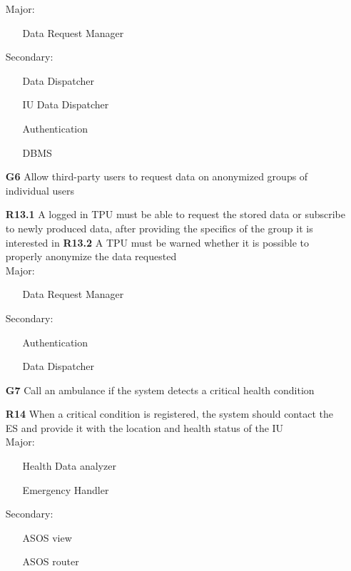 \begin{itemize}
Major:
\begin{itemize}
\item[\textbullet]Data Request Manager 
\end{itemize}
Secondary:
\begin{itemize}
\item[\textbullet]Data Dispatcher
\item[\textbullet]IU Data Dispatcher
\item[\textbullet]Authentication
\item[\textbullet]DBMS
\end{itemize}

\item [\textbf{G6}] Allow third-party users to request data on anonymized groups of individual users

\subitem \textbf{R13.1} A logged in TPU must be able to request the stored data or subscribe to newly produced data, after providing the specifics of the group it is interested in
\subitem \textbf{R13.2} A TPU must be warned whether it is possible to properly anonymize the data requested\\

Major:
\begin{itemize}
\item[\textbullet]Data Request Manager 
\end{itemize}
Secondary:
\begin{itemize}
\item[\textbullet]Authentication
\item[\textbullet]Data Dispatcher
\end{itemize}

\item [\textbf{G7}] Call an ambulance if the system detects a critical health condition

\subitem \textbf{R14} When a critical condition is registered, the system should contact the ES and provide it with the location and health status of the IU\\

Major:
\begin{itemize}
\item[\textbullet] Health Data analyzer
\item[\textbullet] Emergency Handler
\end{itemize}
Secondary:
\begin{itemize}
\item[\textbullet]ASOS view
\item[\textbullet]ASOS router
\end{itemize}


\end{itemize}
